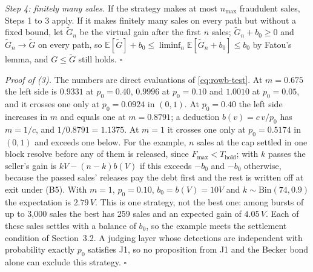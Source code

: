\documentclass[10pt,a4paper]{article}
\newcommand{\Thold}{T_{\mathrm{hold}}}
\newcommand{\Fmax}{F_{\max}}
\newcommand{\E}{\mathbb{E}}
\theoremstyle{plain}
\theoremstyle{remark}
\begin{document}
\emph{Step 4: finitely many sales.} If the strategy makes at most $n_{\max}$ fraudulent sales, Steps 1 to 3 apply. If it makes finitely many sales on every path but without a fixed bound, let $\tilde G_n$ be the virtual gain after the first $n$ sales; $\tilde G_n+b_0\ge0$ and $\tilde G_n\to\tilde G$ on every path, so $\E[\tilde G]+b_0\le\liminf_n\E[\tilde G_n+b_0]\le b_0$ by Fatou's lemma, and $G\le\tilde G$ still holds. \hfill$\square$

\emph{Proof of (3).} The numbers are direct evaluations of \eqref{eq:rowb-test}. At $m=0.675$ the left side is $0.9331$ at $p_0=0.40$, $0.9996$ at $p_0=0.10$ and $1.0010$ at $p_0=0.05$, and it crosses one only at $p_0=0.0924$ in $(0,1)$. At $p_0=0.40$ the left side increases in $m$ and equals one at $m=0.8791$; a deduction $b(v)=c\,v/p_0$ has $m=1/c$, and $1/0.8791=1.1375$. At $m=1$ it crosses one only at $p_0=0.5174$ in $(0,1)$ and exceeds one below. For the example, $n$ sales at the cap settled in one block resolve before any of them is released, since $\Fmax<\Thold$; with $k$ passes the seller's gain is $kV-(n-k)b(V)$ if this exceeds $-b_0$ and $-b_0$ otherwise, because the passed sales' releases pay the debt first and the rest is written off at exit under (B5). With $m=1$, $p_0=0.10$, $b_0=b(V)=10V$ and $k\sim\mathrm{Bin}(74,0.9)$ the expectation is $2.79\,V$. This is one strategy, not the best one: among bursts of up to 3,000 sales the best has 259 sales and an expected gain of $4.05\,V$. Each of these sales settles with a balance of $b_0$, so the example meets the settlement condition of Section~3.2. A judging layer whose detections are independent with probability exactly $p_0$ satisfies J1, so no proposition from J1 and the Becker bond alone can exclude this strategy. \hfill$\square$
\end{document}
